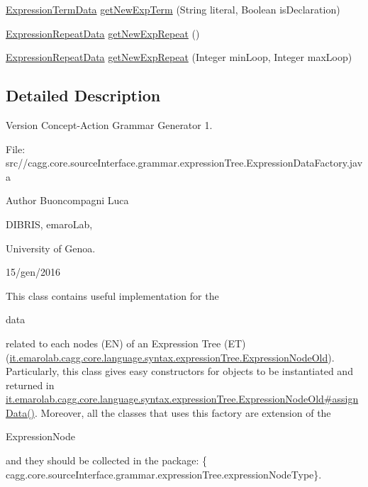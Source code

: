 \begin{DoxyCompactItemize}
\hyperlink{classit_1_1emarolab_1_1cagg_1_1core_1_1language_1_1syntax_1_1expressionTree_1_1ExpressionDataFactory_1_1ExpressionTermData}{Expression\-Term\-Data} \hyperlink{classit_1_1emarolab_1_1cagg_1_1core_1_1language_1_1syntax_1_1expressionTree_1_1ExpressionDataFactory_accb19585f20db9817984cc91b7ff591c}{get\-New\-Exp\-Term} (String literal, Boolean is\-Declaration)
\item 
\hyperlink{classit_1_1emarolab_1_1cagg_1_1core_1_1language_1_1syntax_1_1expressionTree_1_1ExpressionDataFactory_1_1ExpressionRepeatData}{Expression\-Repeat\-Data} \hyperlink{classit_1_1emarolab_1_1cagg_1_1core_1_1language_1_1syntax_1_1expressionTree_1_1ExpressionDataFactory_acf21413cd9f26f98b33b929862232650}{get\-New\-Exp\-Repeat} ()
\item 
\hyperlink{classit_1_1emarolab_1_1cagg_1_1core_1_1language_1_1syntax_1_1expressionTree_1_1ExpressionDataFactory_1_1ExpressionRepeatData}{Expression\-Repeat\-Data} \hyperlink{classit_1_1emarolab_1_1cagg_1_1core_1_1language_1_1syntax_1_1expressionTree_1_1ExpressionDataFactory_afd36a2fcb5b428c494b250b998af6546}{get\-New\-Exp\-Repeat} (Integer min\-Loop, Integer max\-Loop)
\end{DoxyCompactItemize}


\subsection{Detailed Description}
\begin{DoxyVersion}{Version}
Concept-\/\-Action Grammar Generator 1. \par
 File\-: src//cagg.core.\-source\-Interface.\-grammar.\-expression\-Tree.\-Expression\-Data\-Factory.\-java \par

\end{DoxyVersion}
\begin{DoxyAuthor}{Author}
Buoncompagni Luca \par
 D\-I\-B\-R\-I\-S, emaro\-Lab,\par
 University of Genoa. \par
 15/gen/2016 \par

\end{DoxyAuthor}


This class contains useful implementation for the
\begin{DoxyCode}
data 
\end{DoxyCode}
 related to each nodes (E\-N) of an Expression Tree (E\-T) (\hyperlink{}{it.\-emarolab.\-cagg.\-core.\-language.\-syntax.\-expression\-Tree.\-Expression\-Node\-Old}). Particularly, this class gives easy constructors for objects to be instantiated and returned in \hyperlink{}{it.\-emarolab.\-cagg.\-core.\-language.\-syntax.\-expression\-Tree.\-Expression\-Node\-Old\#assign\-Data()}. Moreover, all the classes that uses this factory are extension of the
\begin{DoxyCode}
ExpressionNode 
\end{DoxyCode}
 and they should be collected in the package\-: \{ cagg.\-core.\-source\-Interface.\-grammar.\-expression\-Tree.\-expression\-Node\-Type\}.\par


